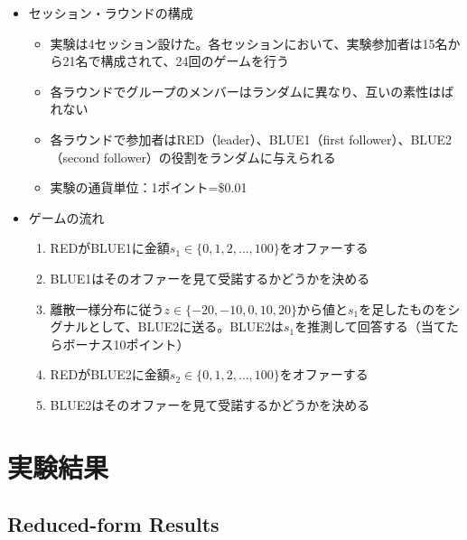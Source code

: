 \documentclass[../root]{subfiles}
\begin{document}
    \begin{itemize}
    
    \item
      セッション・ラウンドの構成

      \begin{itemize}
      
      \item
        実験は4セッション設けた。各セッションにおいて、実験参加者は15名から21名で構成されて、24回のゲームを行う
      \item
        各ラウンドでグループのメンバーはランダムに異なり、互いの素性はばれない
      \item
        各ラウンドで参加者はRED（leader）、BLUE1（first follower）、BLUE2（second follower）の役割をランダムに与えられる
      \item
        実験の通貨単位：1ポイント=\$0.01
      \end{itemize}
    \item
      ゲームの流れ

      \begin{enumerate}
      \def\labelenumi{\arabic{enumi}.}
      
      \item
        REDがBLUE1に金額\(s_1 \in \{0, 1, 2, \ldots, 100\}\)をオファーする
      \item
        BLUE1はそのオファーを見て受諾するかどうかを決める
      \item
        離散一様分布に従う\(z \in \{-20, -10, 0, 10, 20\}\)から値と\(s_1\)を足したものをシグナルとして、BLUE2に送る。BLUE2は\(s_1\)を推測して回答する（当てたらボーナス10ポイント）
      \item
        REDがBLUE2に金額\(s_2 \in \{0, 1, 2, \ldots, 100\}\)をオファーする
      \item
        BLUE2はそのオファーを見て受諾するかどうかを決める
      \end{enumerate}
    \end{itemize}

    \hypertarget{ux5b9fux9a13ux7d50ux679c}{%
    \section{実験結果}\label{ux5b9fux9a13ux7d50ux679c}}

    \hypertarget{reduced-form-results}{%
    \subsection{Reduced-form Results}\label{reduced-form-results}}
\end{document}
